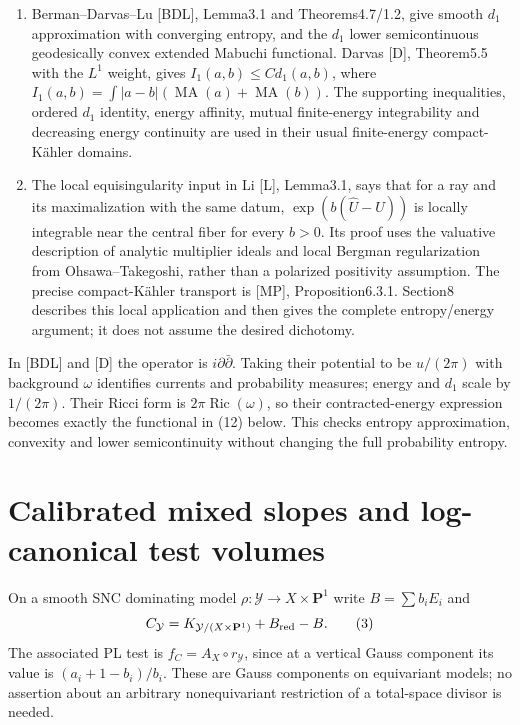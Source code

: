 \documentclass[11pt]{article}
\newcommand{\MA}{\operatorname{MA}}
\newcommand{\Ric}{\operatorname{Ric}}
\begin{document}
\begin{enumerate}
complex Hessian after removal of its compatible divisor. We use this
regularity statement, not its printed time-dependent slope constant.
Section4 proves the model entropy slope directly.
\item Berman--Darvas--Lu [BDL], Lemma3.1 and Theorems4.7/1.2,
give smooth $d_1$ approximation with converging entropy, and the
$d_1$ lower semicontinuous geodesically convex extended Mabuchi
functional. Darvas [D], Theorem5.5 with the $L^1$ weight, gives
$I_1(a,b)\leq C d_1(a,b)$, where
$I_1(a,b)=\int|a-b|(\MA(a)+\MA(b))$.
The supporting inequalities, ordered $d_1$ identity, energy affinity,
mutual finite-energy integrability and decreasing energy continuity
are used in their usual finite-energy compact-K\"ahler domains.
\item The local equisingularity input in Li [L], Lemma3.1, says that
for a ray and its maximalization with the same datum,
$\exp(b(\widehat U-U))$ is locally integrable near the central fiber
for every $b>0$. Its proof uses the valuative description of analytic
multiplier ideals and local Bergman regularization from
Ohsawa--Takegoshi, rather than a polarized positivity assumption.
The precise compact-K\"ahler transport is [MP], Proposition6.3.1.
Section8 describes this local application and then gives the complete
entropy/energy argument; it does not assume the desired dichotomy.
\end{enumerate}
In [BDL] and [D] the operator is $i\partial\bar\partial$.
Taking their potential to be $u/(2\pi)$ with background $\omega$
identifies currents and probability measures; energy and $d_1$ scale
by $1/(2\pi)$. Their Ricci form is $2\pi\Ric(\omega)$, so their
contracted-energy expression becomes exactly the functional in (12)
below. This checks entropy approximation, convexity and lower
semicontinuity without changing the full probability entropy.

\section{Calibrated mixed slopes and log-canonical test volumes}
On a smooth SNC dominating model $\rho:\mathcal Y\to X\times\mathbf P^1$
write $B=\sum b_iE_i$ and
\[
 C_{\mathcal Y}=K_{\mathcal Y/(X\times\mathbf P^1)}+B_{\rm red}-B.
                                                               \tag{3}
\]
The associated PL test is
$f_C=A_X\circ r_{\mathcal Y}$, since at a vertical Gauss component
its value is $(a_i+1-b_i)/b_i$. These are Gauss components on
equivariant models; no assertion about an arbitrary nonequivariant
restriction of a total-space divisor is needed.
\end{document}
